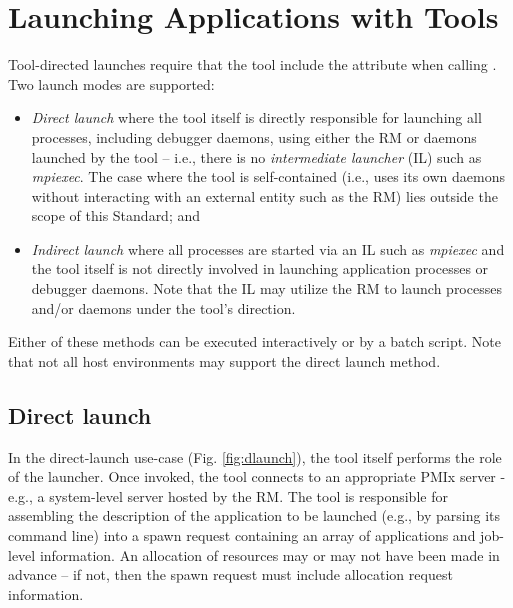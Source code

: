 \section{Launching Applications with Tools}
\label{chap:api_tools:launch}

Tool-directed launches require that the tool include the  attribute when calling . Two launch modes are supported:

\begin{itemize}
    \item \emph{Direct launch} where the tool itself is directly responsible for launching all processes, including debugger daemons, using either the \ac{RM} or daemons launched by the tool – i.e., there is no \emph{intermediate launcher} (IL) such as \emph{mpiexec}. The case where the tool is self-contained (i.e., uses its own daemons without interacting with an external entity such as the \ac{RM}) lies outside the scope of this Standard; and
    \item \emph{Indirect launch} where all processes are started via an \ac{IL} such as \emph{mpiexec} and the tool itself is not directly involved in launching application processes or debugger daemons. Note that the \ac{IL} may utilize the \ac{RM} to launch processes and/or daemons under the tool's direction.
\end{itemize}

Either of these methods can be executed interactively or by a batch script. Note that not all host environments may support the direct launch method.

\subsection{Direct launch}
\label{chap:api_tools:direct}

In the direct-launch use-case (Fig. \ref{fig:dlaunch}), the tool itself performs the role of the launcher. Once invoked, the tool connects to an appropriate \ac{PMIx} server - e.g., a system-level server hosted by the \ac{RM}. The tool is responsible for assembling the description of the application to be launched (e.g., by parsing its command line) into a spawn request containing an array of  applications and  job-level information. An allocation of resources may or may not have been made in advance – if not, then the spawn request must include allocation request information.

